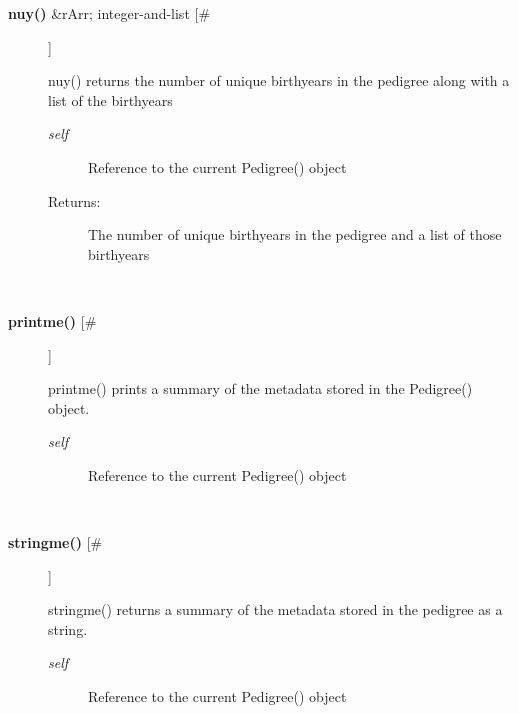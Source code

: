 \begin{description}
\item[\textbf{nuy()}
 \&rArr; integer-and-list [\#]]

 nuy() returns the number of unique birthyears in the pedigree along with a list of the birthyears
\begin{description}
\item[\emph{self}
] Reference to the current Pedigree() object
\item[Returns:] The number of unique birthyears in the pedigree and a list of those birthyears

\end{description}
\\ 

\item[\textbf{printme()}
 [\#]]

 printme() prints a summary of the metadata stored in the Pedigree() object.
\begin{description}
\item[\emph{self}
] Reference to the current Pedigree() object

\end{description}
\\ 

\item[\textbf{stringme()}
 [\#]]

 stringme() returns a summary of the metadata stored in the pedigree as a string.
\begin{description}
\item[\emph{self}
] Reference to the current Pedigree() object

\end{description}
\\ 


\end{description}

